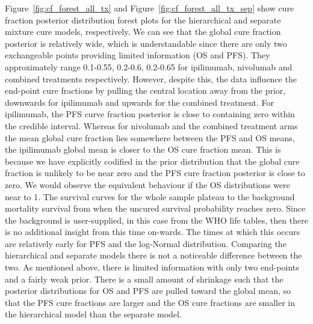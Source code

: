 \documentclass[AMA,STIX1COL]{WileyNJD-v2}
\begin{document}
Figure~\ref{fig:cf_forest_all_tx} and Figure~\ref{fig:cf_forest_all_tx_sep} show cure fraction posterior distribution forest plots for the hierarchical and separate mixture cure models, respectively. 
We can see that the global cure fraction posterior is relatively wide, which is understandable since there are only two exchangeable points providing limited information (OS and PFS).
They approximately range 0.1-0.55, 0.2-0.6, 0.2-0.65 for ipilimumab, nivolumab and combined treatments respectively. 
However, despite this, the data influence the end-point cure fractions by pulling the central location away from the prior, downwards for ipilimumab and upwards for the combined treatment.
For ipilimumab, the PFS curve fraction posterior is close to containing zero within the credible interval.
Whereas for nivolumab and the combined treatment arms the mean global cure fraction lies somewhere between the PFS and OS means, the ipilimumab global mean is closer to the OS cure fraction mean. This is because we have explicitly codified in the prior distribution that the global cure fraction is unlikely to be near zero and the PFS cure fraction posterior is close to zero.
We would observe the equivalent behaviour if the OS distributions were near to 1.
The survival curves for the whole sample plateau to the background mortality survival from when the uncured survival probability reaches zero.
Since the background is user-supplied, in this case from the WHO life tables, then there is no additional insight from this time on-wards.
The times at which this occurs are relatively early for PFS and the log-Normal distribution.
Comparing the hierarchical and separate models there is not a noticeable difference between the two.
As mentioned above, there is limited information with only two end-points and a fairly weak prior.
There is a small amount of shrinkage such that the posterior distributions for OS and PFS are pulled toward the global mean, so that the PFS cure fractions are larger and the OS cure fractions are smaller in the hierarchical model than the separate model.
\end{document}
